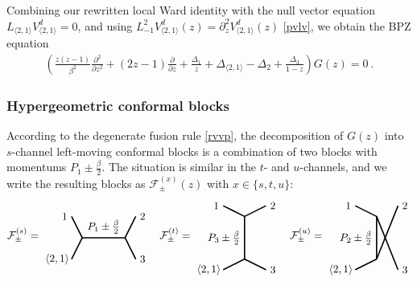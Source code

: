 \documentclass[12pt, a4paper]{article}
\theoremstyle{break}
\begin{document}
Combining our rewritten local Ward identity with the null vector equation $L_{\langle 2,1\rangle}V^d_{\langle 2,1\rangle}=0$, and using $L_{-1}^2 V^d_{\langle 2,1\rangle}(z) = \partial_z^2 V^d_{\langle 2,1\rangle}(z)$ \eqref{pvlv}, we obtain the BPZ equation 
\begin{align}
 \left(\frac{z(z-1)}{\beta^2}\frac{\partial^2}{\partial z^2} + (2z-1)\frac{\partial}{\partial z} + \frac{\Delta_1}{z} + \Delta_{\langle 2,1\rangle}-\Delta_2  +\frac{\Delta_3}{1-z} \right) G(z) = 0 \ .
\end{align}

\subsubsection{Hypergeometric conformal blocks}

According to the degenerate fusion rule \eqref{rvvp}, the decomposition of $G(z)$ into $s$-channel left-moving conformal blocks is a combination of two blocks with momentums $P_1\pm \frac{\beta}{2}$. The situation is similar in the $t$- and $u$-channels, and we write the resulting blocks as $\mathcal{F}^{(x)}_\pm(z)$ with $x\in\{s,t,u\}$:
\begin{align}
\mathcal{F}^{(s)}_\pm = 
 \begin{tikzpicture}[baseline=(current  bounding  box.center), very thick, scale = .35]
\draw (-1,2) node [left] {$1$} -- (0,0) -- node [above] {$P_1\pm\frac{\beta}{2}$} (4,0) -- (5,2) node [right] {$2$};
\draw (-1,-2) node [left] {$\langle 2,1\rangle\!$} -- (0,0);
\draw (4,0) -- (5,-2) node [right] {$3$};
\end{tikzpicture}
\quad 
\mathcal{F}^{(t)}_\pm = 
\begin{tikzpicture}[baseline=(current  bounding  box.center), very thick, scale = .35]
 \draw (-2,3) node [left] {$1$} -- (0,2) -- node [left] {$P_3\pm\frac{\beta}{2}$} (0,-2) -- (-2, -3) node [left] {$\langle 2,1\rangle\!$};
\draw (0,2) -- (2,3) node [right] {$2$};
\draw (0,-2) -- (2, -3) node [right] {$3$};
\end{tikzpicture}
\quad 
\mathcal{F}^{(u)}_\pm = 
\begin{tikzpicture}[baseline=(current  bounding  box.center), very thick, scale = .35]
\draw (-2,1) node [left] {$1$} -- (0,0) -- node [left] {$P_2\pm \frac{\beta}{2}$} (0,-4) ;
\draw (0,0)-- (2,-5) node [right] {$3$};
\draw (-2,-5) node [left] {$\langle 2,1\rangle\!$} -- (0,-4);
\draw (0,-4) -- (2,1) node [right] {$2$};
\end{tikzpicture} 
\end{align}
\end{document}
